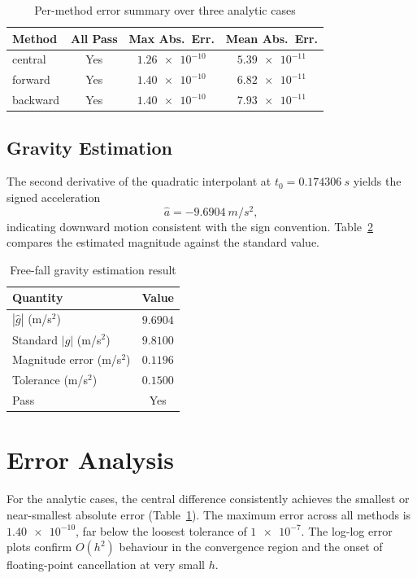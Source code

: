 \documentclass[letterpaper,twocolumn,fleqn]{article}
\begin{document}
\begin{table}[h!]
\caption{Per-method error summary over three analytic cases}
\vspace{12pt}
\label{tab:summary}
\centering
{\small
\setlength{\tabcolsep}{3pt}
\begin{tabular}{|l|c|c|c|}
\hline
Method   & All Pass & Max Abs.\ Err. & Mean Abs.\ Err. \\\hline
central  & Yes & $\num{1.26e-10}$ & $\num{5.39e-11}$ \\\hline
forward  & Yes & $\num{1.40e-10}$ & $\num{6.82e-11}$ \\\hline
backward & Yes & $\num{1.40e-10}$ & $\num{7.93e-11}$ \\\hline
\end{tabular}
}
\end{table}

\subsection{Gravity Estimation}
The second derivative of the quadratic interpolant at $t_{0}=\qty{0.174306}{s}$ yields the signed acceleration
\[
\hat{a} = \qty{-9.6904}{m/s^2},
\]
indicating downward motion consistent with the sign convention. Table~\ref{tab:gravity} compares the estimated magnitude against the standard value.

\begin{table}[h!]
\caption{Free-fall gravity estimation result}
\vspace{12pt}
\label{tab:gravity}
\centering
{\small
\setlength{\tabcolsep}{3pt}
\begin{tabular}{|l|c|}
\hline
Quantity & Value \\\hline
$|\hat{g}|$ (m/s$^{2}$)       & $\num{9.6904}$ \\\hline
Standard $|g|$ (m/s$^{2}$)    & $\num{9.8100}$ \\\hline
Magnitude error (m/s$^{2}$)   & $\num{0.1196}$ \\\hline
Tolerance (m/s$^{2}$)         & $\num{0.1500}$ \\\hline
Pass                           & Yes            \\\hline
\end{tabular}
}
\end{table}

\section{Error Analysis}
For the analytic cases, the central difference consistently achieves the smallest or near-smallest absolute error (Table~\ref{tab:summary}). The maximum error across all methods is $\num{1.40e-10}$, far below the loosest tolerance of $\num{1e-7}$. The log-log error plots confirm $O(h^{2})$ behaviour in the convergence region and the onset of floating-point cancellation at very small $h$.
\end{document}
